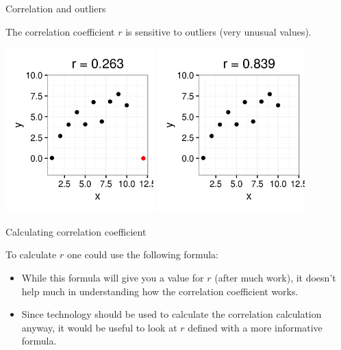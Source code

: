 \documentclass[xcolor=table, aspectratio=169, bigger]{beamer}
\begin{document}
\begin{frame}{Correlation and outliers}
\begin{block}{}
The correlation coefficient $r$ is sensitive to outliers (very unusual values).
\end{block}
{\centering
\includegraphics[width=2.25in]{../images/ch10_cor_w_out}
\pause\includegraphics[width=2.25in]{../images/ch10_cor_wo_out}
\par}
\end{frame}

\begin{frame}{Calculating correlation coefficient}
\begin{block}{}
To calculate $r$ one could use the following formula:\\
\medskip
{}
\medskip
\begin{itemize}
\pause\item While this formula will give you a value for $r$ (after much work), it doesn't help much in understanding how the correlation coefficient works. 
\pause\item Since technology should be used to calculate the correlation calculation anyway, it would be useful to look at $r$ defined with a more informative formula.
\end{itemize}
\end{block}
\end{frame}
\end{document}
